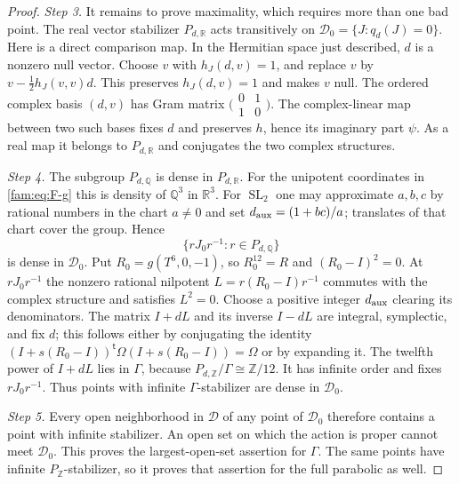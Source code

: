 \documentclass[11pt,a4paper]{article}
\theoremstyle{plain}
\theoremstyle{definition}
\begin{document}
\begin{proof}
\par\noindent\textit{Step 3.} It remains to prove maximality, which requires more than one bad point.
The real vector stabilizer $P_{d,\mathbb R}$ acts transitively on
$\mathcal D_0=\{J:q_d(J)=0\}$.  Here is a direct comparison map.  In the
Hermitian space just described, $d$ is a nonzero null vector.  Choose
$v$ with $h_J(d,v)=1$, and replace $v$ by
$v-\tfrac12h_J(v,v)d$.  This preserves $h_J(d,v)=1$ and makes $v$ null.
The ordered complex basis $(d,v)$ has Gram matrix
$\bigl(\begin{smallmatrix}0&1\\1&0\end{smallmatrix}\bigr)$.
The complex-linear map between two such bases fixes $d$ and preserves
$h$, hence its imaginary part $\psi$.  As a real map it belongs to
$P_{d,\mathbb R}$ and conjugates the two complex structures.

\par\noindent\textit{Step 4.} The subgroup $P_{d,\mathbb Q}$ is dense in $P_{d,\mathbb R}$.
For the unipotent coordinates in \eqref{fam:eq:F-g} this is density of
$\mathbb Q^3$ in $\mathbb R^3$.  For $\operatorname{SL}_2$ one may
approximate $a,b,c$ by rational numbers in the chart $a\ne0$ and set
$d_{\rm aux}=(1+bc)/a$; translates of that chart cover the group.  Hence
\[
 \{rJ_0r^{-1}:r\in P_{d,\mathbb Q}\}
\]
is dense in $\mathcal D_0$.
Put $R_0=g(T^6,0,-1)$, so $R_0^{12}=R$ and
$(R_0-I)^2=0$.  At $rJ_0r^{-1}$ the nonzero rational nilpotent
$L=r(R_0-I)r^{-1}$ commutes with the complex structure and satisfies
$L^2=0$.  Choose a positive integer $d_{\rm aux}$ clearing its denominators.
The matrix $I+dL$ and its inverse $I-dL$ are integral, symplectic, and
fix $d$; this follows either by conjugating the identity
$(I+s(R_0-I))^{\mathsf t}\Omega(I+s(R_0-I))=\Omega$ or by expanding it.
The twelfth power of $I+dL$ lies in $\Gamma$, because
$P_{d,\mathbb Z}/\Gamma\cong\mathbb Z/12$.  It has infinite order and
fixes $rJ_0r^{-1}$.  Thus points with infinite $\Gamma$-stabilizer are
dense in $\mathcal D_0$.

\par\noindent\textit{Step 5.} Every open neighborhood in $\mathcal D$ of any point of $\mathcal D_0$
therefore contains a point with infinite stabilizer.  An open set on
which the action is proper cannot meet $\mathcal D_0$.  This proves the
largest-open-set assertion for $\Gamma$.  The same points have infinite
$P_{\mathbb Z}$-stabilizer, so it proves that assertion for the full
parabolic as well.
\end{proof}
\end{document}
